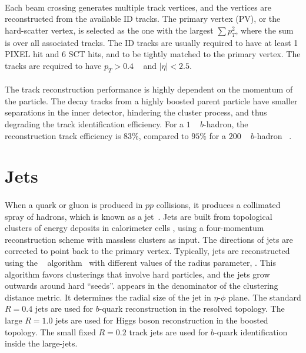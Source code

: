 \paragraph{}
Each beam crossing generates multiple track vertices, and the vertices are reconstructed from the available ID tracks. 
The primary vertex (PV), or the hard-scatter vertex, is selected as the one with the largest $\sum p_T^2$, where the sum is over all associated tracks.
The ID tracks are usually required to have at least 1 PIXEL hit and 6 SCT hits, and to be tightly matched to the primary vertex.
The tracks are required to have $p_T > 0.4$ \GeV~ and $|\eta| < 2.5$.

\paragraph{}
The track reconstruction performance is highly dependent on the momentum of the particle. 
The decay tracks from a highly boosted parent particle have smaller separations in the inner detector, hindering the cluster process, and thus degrading the track identification efficiency. 
For a $1$ \TeV~ $b$-hadron, the reconstruction track efficiency is $83\%$, compared to $95\%$ for a $200$ \GeV~ $b$-hadron ~\cite{Aaboud:2017all}.

\section{Jets}
\paragraph{}
When a quark or gluon is produced in $pp$ collisions, it produces a collimated spray of hadrons, which is known as a jet~\cite{Salam:2009jx}.
Jets are built from topological clusters of energy deposits in calorimeter cells \cite{PERF-2014-07}, using a four-momentum reconstruction scheme with massless clusters as input. 
The directions of jets are corrected to point back to the primary vertex.
Typically, jets are reconstructed using the \akt~ algorithm~\cite{AntiKt} with different values of the radius parameter, \R. 
This algorithm favors clusterings that involve hard particles, and the jets grow outwards around hard ``seeds''.
\R appears in the denominator of the clustering distance metric.
It determines the radial size of the jet in $\eta$-$\phi$ plane.
The standard $R=0.4$ jets are used for $b$-quark reconstruction in the resolved topology.
The large $R=1.0$ jets are used for Higgs boson reconstruction in the boosted topology.
The small fixed $R=0.2$ track jets are used for $b$-quark identification inside the large-\R jets.

